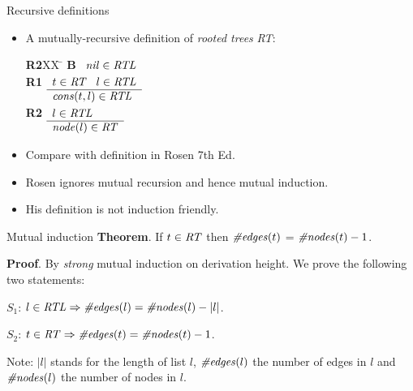 \begin{wideslide}[bm=,toc=]{Recursive definitions}
\begin{itemize}
\item A mutually-recursive definition of {\em rooted trees\/} {\em RT\/}:
\begin{tabbing}
{\bf R2}XX \=  \kill
{\bf B} \>
        \(\begin{array}[t]{l}
        \mbox{\it nil\/}\in\mbox{\it RTL\/}
        \end{array}\) \\[2ex]
{\bf R1} \>
        \(\begin{array}[t]{l}
        t\in\mbox{\it RT\/}\;\;\;l\in\mbox{\it RTL\/} \\
        \hline
        \mbox{\it cons\/}(t,l)\in\mbox{\it RTL\/}
        \end{array}\) \\[2ex]
{\bf R2} \>
        \(\begin{array}[t]{l}
        l\in\mbox{\it RTL\/} \\
        \hline
        \mbox{\it node\/}(l)\in\mbox{\it RT\/}
        \end{array}\)
\end{tabbing}
\item Compare with definition in Rosen 7th Ed.
\item Rosen ignores mutual recursion and hence mutual induction.
\item His definition is not induction friendly.
\end{itemize}
\end{wideslide}

\begin{wideslide}[bm=,toc=]{Mutual induction}
{\bf Theorem}. If $t\in\mbox{\it RT\/}$ then $\mbox{\it \#edges\/}(t)$ = $\mbox{\it \#nodes\/}(t) - 1$.
\vspace{1em}

{\bf Proof}.  By {\em strong\/} mutual induction on derivation height. 
We prove the following two statements:
\vspace{1em}

$S_1$: $l\in \mbox{\it RTL\/}\Rightarrow \mbox{\it \#edges\/}(l) = \mbox{\it \#nodes\/}(l) - |l|$.

$S_2$: $t\in \mbox{\it RT\/}\Rightarrow \mbox{\it \#edges\/}(t) = \mbox{\it \#nodes\/}(t) - 1$.

\vspace{2em}
Note: $|l|$ stands for the length of list $l$, $\mbox{\it \#edges\/}(l)$ the number of edges in $l$
and $\mbox{\it \#nodes\/}(l)$ the number of nodes in $l$.
\end{wideslide}

